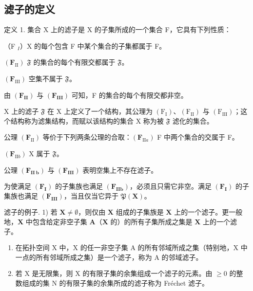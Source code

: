 \subsection{滤子的定义}

定义 1. 集合 X 上的滤子是 X 的子集所成的一个集合 F，它具有下列性质：

（F \(_{I}\)）X 的每个包含 F 中某个集合的子集都属于 F。

\((\mathbf{F}_{\mathrm{II}})\) \(\mathfrak{F}\) 的集合的每个有限交都属于 \(\mathfrak{F}\)。

\((\mathbf{F}_{\mathrm{III}})\) 空集不属于 \(\mathfrak{F}\)。

由 \((\mathbf{F}_{\mathbf{II}})\) 与 \((\mathbf{F}_{\mathbf{III}})\) 可知，F 的集合的每个有限交都非空。

X 上的滤子 \(\mathfrak{F}\) 在 X 上定义了一个结构，其公理为 \((\mathrm{F_I})\)、\((\mathrm{F_{II}})\) 与 \((\mathrm{F_{III}})\)；这个结构称为滤集结构，而赋以该结构的集合 X 称为被 \(\mathfrak{F}\) 滤化的集合。

公理 \((\mathbf{F}_{\mathrm{II}})\) 等价于下列两条公理的合取：\((\mathbf{F}_{\mathrm{II}a})\) F 中两个集合的交属于 F。

\((\mathbf{F}_{\mathrm{II}b})\) X 属于 \(\mathfrak{F}\)。

公理 \((\mathbf{F}_{\mathbf{II}\ \mathbf{b}})\) 与 \((\mathbf{F}_{\mathbf{III}})\) 表明空集上不存在滤子。

为使满足 \((\mathbf{F}_{\mathbf{I}})\) 的子集族也满足 \((\mathbf{F}_{\mathbf{II}\mathbf{b}})\)，必须且只需它非空。满足 \((\mathbf{F}_{\mathbf{I}})\) 的子集族也满足 \((\mathbf{F}_{\mathbf{III}})\)，当且仅当它异于 \(\mathfrak{P}(\mathbf{X})\)。

滤子的例子. 1) 若 \(\mathbf{X} \neq \emptyset\)，则仅由 \(\mathbf{X}\) 组成的子集族是 \(\mathbf{X}\) 上的一个滤子。更一般地，\(\mathbf{X}\) 中包含给定非空子集 \(\mathbf{A}\)（\(\mathbf{X}\) 的）的所有子集所成之集是 \(\mathbf{X}\) 上的一个滤子。

\begin{enumerate}
\def\labelenumi{\arabic{enumi})}
\setcounter{enumi}{1}
\item
  在拓扑空间 X 中，X 的任一非空子集 A 的所有邻域所成之集（特别地，X 中一点的所有邻域所成之集）是一个滤子，称为 A 的邻域滤子。
\item
  若 X 是无限集，则 X 的有限子集的余集组成一个滤子的元素。由 \(\geqslant0\) 的整数组成的集 N 的有限子集的余集所成的滤子称为 Fréchet 滤子。
\end{enumerate}

